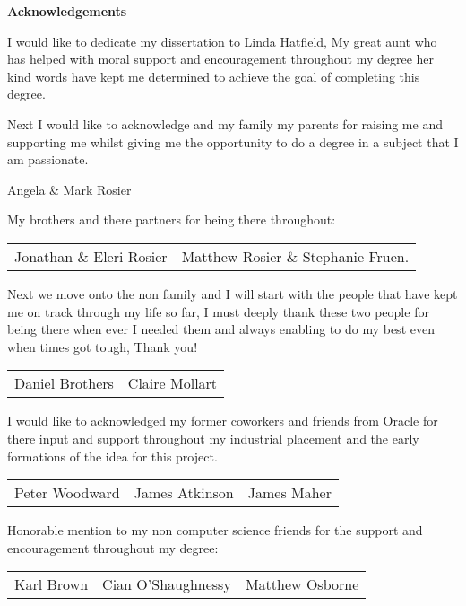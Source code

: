 \thispagestyle{empty}

\begin{center}
{\LARGE\bf Acknowledgements}

I would like to dedicate my dissertation to Linda Hatfield, My great aunt who has helped with moral support and encouragement throughout my degree her kind words have kept me determined to achieve the goal of completing this degree.

Next I would like to acknowledge and my family my parents for raising me and supporting me whilst giving me the opportunity to do a degree in a subject that I am passionate.

Angela \& Mark Rosier

My brothers and there partners for being there throughout:

\begin{tabular}{ l r }
Jonathan \& Eleri Rosier & Matthew Rosier \& Stephanie Fruen.\\
\end{tabular}

\vspace{4mm}

Next we move onto the non family and I will start with the people that have kept me on track through my life so far, I must deeply thank these two people for being there when ever I needed them and always enabling to do my best even when times got tough, Thank you!

\begin{tabular}{ l r }
Daniel Brothers & Claire Mollart\\
\end{tabular}

\vspace{4mm}

I would like to acknowledged my former coworkers and friends from Oracle for there input and support throughout my industrial placement and the early formations of the idea for this project.

\begin{tabular}{ l c r }
Peter Woodward & James Atkinson & James Maher\\
\end{tabular}

\vspace{4mm}

Honorable mention to my non computer science friends for the support and encouragement throughout my degree:

\begin{tabular}{ l c r }
Karl Brown & Cian O'Shaughnessy & Matthew Osborne\\
\end{tabular}


\end{center}
